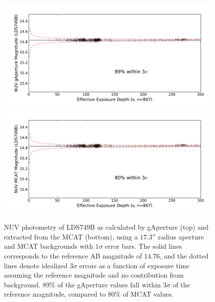 \documentclass[preprint]{aastex}
\begin{document}
\begin{figure}[t!]
\includegraphics[scale=0.6]{Fig06a.pdf}\\
\includegraphics[scale=0.6]{Fig06b.pdf}
\caption{NUV photometry of LDS749B as calculated by gAperture (top) and extracted from the MCAT (bottom), using a $17.3''$ radius aperture and MCAT backgrounds with $1\sigma$ error bars. The solid lines corresponds to the reference AB magnitude of $14.76$, and the dotted lines denote idealized $3\sigma$ errors as a function of exposure time assuming the reference magnitude and no contribution from background. $89\%$ of the gAperture values fall within $3\sigma$ of the reference magnitude, compared to $80\%$ of MCAT values.
\label{ldsabsphotnuv}}
\end{figure}
\clearpage
\end{document}
